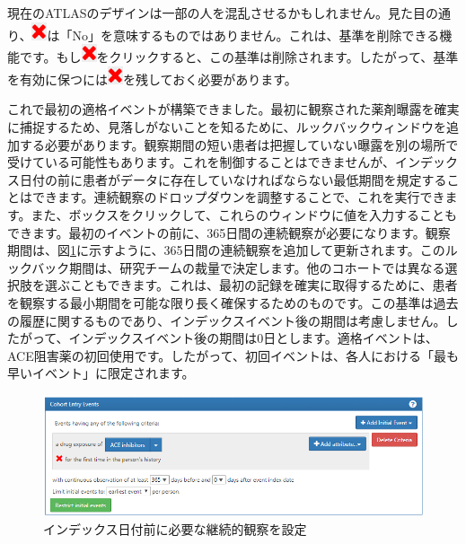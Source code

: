 \documentclass[
  11pt]{book}
\makeatletter
\newenvironment{kframe}{%
\medskip{}
\setlength{\fboxsep}{.8em}
 \def\at@end@of@kframe{}%
 \ifinner\ifhmode%
  \def\at@end@of@kframe{\end{minipage}}%
  \begin{minipage}{\columnwidth}%
 \fi\fi%
 \def\FrameCommand##1{\hskip\@totalleftmargin \hskip-\fboxsep
 \colorbox{myShadeColor}{##1}\hskip-\fboxsep
     \hskip-\linewidth \hskip-\@totalleftmargin \hskip\columnwidth}%
 \MakeFramed {\advance\hsize-\width
   \@totalleftmargin\z@ \linewidth\hsize
   \@setminipage}}%
 {\par\unskip\endMakeFramed%
 \at@end@of@kframe}
\newenvironment{rmdblock}[1]
  {
  \begin{itemize}
  \renewcommand{\labelitemi}{
    \raisebox{-.7\height}[0pt][0pt]{
      {\setkeys{Gin}{width=3em,keepaspectratio}\texttt{[image: images/\#1]}}
    }
  }
  \setlength{\fboxsep}{1em}
  \begin{kframe}
  \item
  }
  {
  \end{kframe}
  \end{itemize}
  }
\newenvironment{rmdimportant}
  {\begin{rmdblock}{important}}
  {\end{rmdblock}}
\theoremstyle{definition}
\theoremstyle{definition}
\theoremstyle{definition}
\theoremstyle{definition}
\theoremstyle{remark}
\makeatother
\begin{document}
\begin{rmdimportant}
現在のATLASのデザインは一部の人を混乱させるかもしれません。見た目の通り、\includegraphics{images/Cohorts/redX.png}は「No」を意味するものではありません。これは、基準を削除できる機能です。もし\includegraphics{images/Cohorts/redX.png}をクリックすると、この基準は削除されます。したがって、基準を有効に保つには\includegraphics{images/Cohorts/redX.png}を残しておく必要があります。
\end{rmdimportant}

これで最初の適格イベントが構築できました。最初に観察された薬剤曝露を確実に捕捉するため、見落しがないことを知るために、ルックバックウィンドウを追加する必要があります。観察期間の短い患者は把握していない曝露を別の場所で受けている可能性もあります。これを制御することはできませんが、インデックス日付の前に患者がデータに存在していなければならない最低期間を規定することはできます。連続観察のドロップダウンを調整することで、これを実行できます。また、ボックスをクリックして、これらのウィンドウに値を入力することもできます。最初のイベントの前に、365日間の連続観察が必要になります。観察期間は、図\ref{fig:initialEventAce}に示すように、365日間の連続観察を追加して更新されます。このルックバック期間は、研究チームの裁量で決定します。他のコホートでは異なる選択肢を選ぶこともできます。これは、最初の記録を確実に取得するために、患者を観察する最小期間を可能な限り長く確保するためのものです。この基準は過去の履歴に関するものであり、インデックスイベント後の期間は考慮しません。したがって、インデックスイベント後の期間は0日とします。適格イベントは、ACE阻害薬の初回使用です。したがって、初回イベントは、各人における「最も早いイベント」に限定されます。

\begin{figure}

{\centering \includegraphics[width=1\linewidth]{images/Cohorts/initialEventAce} 

}

\caption{インデックス日付前に必要な継続的観察を設定}\label{fig:initialEventAce}
\end{figure}
\end{document}
